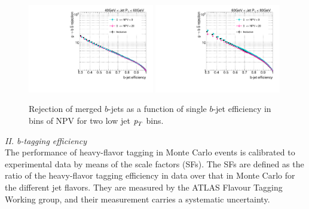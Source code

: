 \begin{figure}[tp]
\centering
\includegraphics[width=0.49\textwidth]{FIGS/systematics/LlhoodKDE_ISO_PileUp_rejvseff040.pdf}
\includegraphics[width=0.49\textwidth]{FIGS/systematics/LlhoodKDE_ISO_PileUp_rejvseff060.pdf}
\caption{Rejection of merged $b$-jets as a function of single $b$-jet efficiency in bins of NPV for two low jet ${\emph{p}_{T}}$ bins.}
\label{fig:performanceinbinsMu}
\end{figure}

\vspace{3mm}
{\em II. b-tagging efficiency} %
\\[3mm]
The performance of heavy-flavor tagging in Monte Carlo events is calibrated to experimental data by means of the scale factors (SFs). %
The SFs are defined as the ratio of the heavy-flavor tagging efficiency in data over that in Monte Carlo for the different jet flavors. They are measured by the ATLAS Flavour Tagging Working group,  %
and their measurement carries a systematic uncertainty.  

